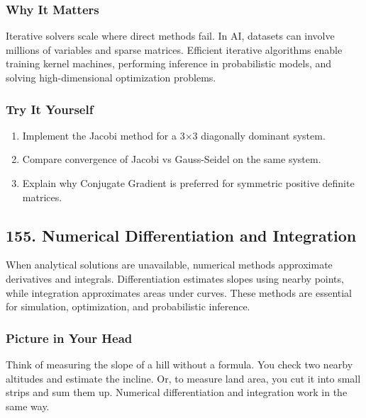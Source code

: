 \documentclass[
  letterpaper,
  DIV=11,
  numbers=noendperiod]{scrreprt}
\providecommand{\tightlist}{%
  \setlength{\itemsep}{0pt}\setlength{\parskip}{0pt}}
\begin{document}
\subsubsection{Why It Matters}\label{why-it-matters-51}

Iterative solvers scale where direct methods fail. In AI, datasets can
involve millions of variables and sparse matrices. Efficient iterative
algorithms enable training kernel machines, performing inference in
probabilistic models, and solving high-dimensional optimization
problems.

\subsubsection{Try It Yourself}\label{try-it-yourself-153}

\begin{enumerate}
\def\labelenumi{\arabic{enumi}.}
\tightlist
\item
  Implement the Jacobi method for a 3×3 diagonally dominant system.
\item
  Compare convergence of Jacobi vs Gauss-Seidel on the same system.
\item
  Explain why Conjugate Gradient is preferred for symmetric positive
  definite matrices.
\end{enumerate}

\subsection{155. Numerical Differentiation and
Integration}\label{numerical-differentiation-and-integration}

When analytical solutions are unavailable, numerical methods approximate
derivatives and integrals. Differentiation estimates slopes using nearby
points, while integration approximates areas under curves. These methods
are essential for simulation, optimization, and probabilistic inference.

\subsubsection{Picture in Your Head}\label{picture-in-your-head-154}

Think of measuring the slope of a hill without a formula. You check two
nearby altitudes and estimate the incline. Or, to measure land area, you
cut it into small strips and sum them up. Numerical differentiation and
integration work in the same way.
\end{document}
